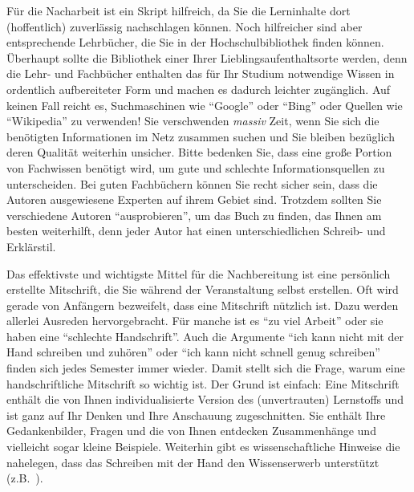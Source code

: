Für die Nacharbeit ist ein Skript hilfreich, da Sie die Lerninhalte dort (hoffentlich) zuverlässig nachschlagen können. Noch hilfreicher sind aber entsprechende Lehrbücher, die Sie in der Hochschulbibliothek finden können. Überhaupt sollte die Bibliothek einer Ihrer Lieblingsaufenthaltsorte werden, denn die Lehr- und Fachbücher enthalten das für Ihr Studium notwendige Wissen in ordentlich aufbereiteter Form und machen es dadurch leichter zugänglich. Auf keinen Fall reicht es,  Suchmaschinen wie "`Google"' oder "`Bing"' oder Quellen wie "`Wikipedia"' zu verwenden! Sie  verschwenden \emph{massiv} Zeit, wenn Sie sich die benötigten Informationen im Netz zusammen  suchen und Sie bleiben bezüglich deren Qualität weiterhin unsicher. Bitte bedenken Sie, dass eine große Portion von Fachwissen benötigt wird, um gute und schlechte Informationsquellen zu unterscheiden. Bei guten Fachbüchern können Sie recht sicher sein, dass die Autoren ausgewiesene Experten auf ihrem Gebiet sind. Trotzdem sollten Sie verschiedene Autoren "`ausprobieren"', um das
Buch zu finden, das Ihnen am besten weiterhilft, denn jeder Autor hat einen unterschiedlichen
Schreib- und Erklärstil. 

Das effektivste und wichtigste Mittel für die Nachbereitung ist eine persönlich erstellte Mitschrift, die Sie während der Veranstaltung selbst erstellen. Oft wird gerade von Anfängern bezweifelt, dass eine Mitschrift nützlich ist. Dazu werden allerlei Ausreden hervorgebracht. Für manche ist es "`zu viel Arbeit"' oder sie haben eine "`schlechte Handschrift"'. Auch die Argumente "`ich kann nicht 
mit der Hand schreiben und zuhören"' oder "`ich kann nicht schnell genug schreiben"' finden sich jedes Semester immer wieder. Damit stellt sich die Frage, warum eine handschriftliche  Mitschrift so wichtig ist. Der Grund ist einfach: Eine Mitschrift enthält die von Ihnen individualisierte Version des (unvertrauten) Lernstoffs und ist  ganz auf Ihr Denken und Ihre Anschauung zugeschnitten. Sie enthält Ihre Gedankenbilder, Fragen und die von Ihnen entdecken Zusammenhänge und vielleicht sogar kleine Beispiele. Weiterhin gibt es wissenschaftliche Hinweise die nahelegen, dass das Schreiben mit der Hand den Wissenserwerb unterstützt (z.B.~\cite{MuBe14}). 

